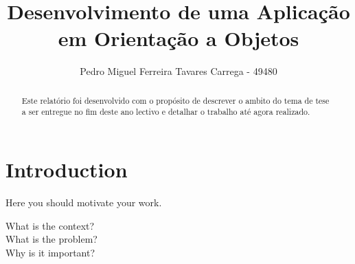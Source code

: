 \documentclass[sigplan]{acmart}
\begin{document}
\title{Desenvolvimento de uma Aplicação em Orientação a Objetos}


\author{Pedro Miguel Ferreira Tavares Carrega - 49480}


\renewcommand{\shortauthors}{Pedro Miguel Ferreira Tavares Carrega - 49480}

\begin{abstract}
  Este relatório foi desenvolvido com o propósito de descrever o ambito do tema de tese a ser entregue no fim deste ano lectivo e detalhar o trabalho até agora realizado. 
\end{abstract}




\maketitle

\section{Introduction}

Here you should motivate your work. 

What is the context? \\ %

What is the problem? \\ %

Why is it important? \\ %
\end{document}
